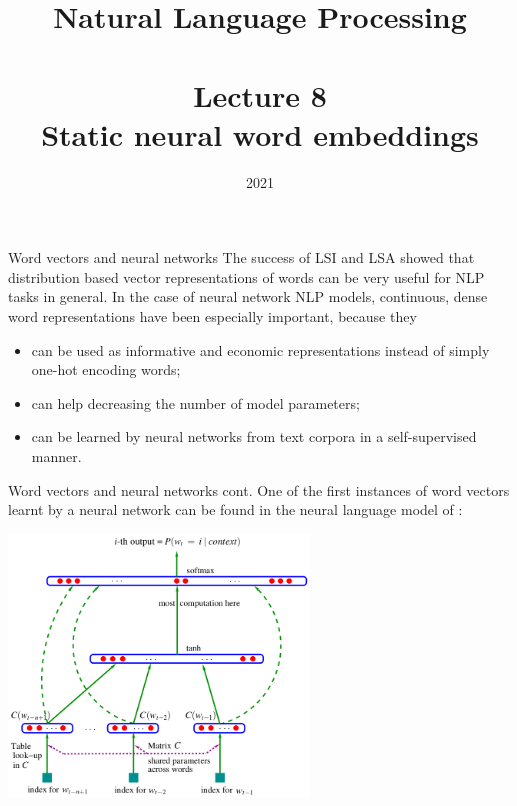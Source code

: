 \documentclass[style=upen, size=14pt]{powerdot}
\theoremstyle{definition}
\begin{document}
\title{Natural Language Processing\\~~\\Lecture 8\\Static neural word embeddings}

\date{2021}
\maketitle

\begin{slide}[toc=Vectors and NNs]{Word vectors and neural networks}
  The success of LSI and LSA showed that distribution based vector
  representations of words can be very useful for NLP tasks in general. In the
  case of neural network NLP models, continuous, dense word representations have
  been especially important, because they
  \begin{itemize} 
  \item can be used as informative and economic representations instead of
    simply one-hot encoding words;
  \item can help decreasing the number of model parameters;
  \item can be learned by neural networks from text corpora in a self-supervised
    manner.
  \end{itemize}
\end{slide}

\begin{slide}[toc=]{Word vectors and neural networks cont.}
  One of the first instances of word vectors learnt by a neural network can be
  found in the neural language model of \cite{bengio2003neural}:
  \begin{center}
  \includegraphics[width=0.6\textwidth]{figures/neural_lm.eps}
  \end{center}
\end{slide}
\end{document}
